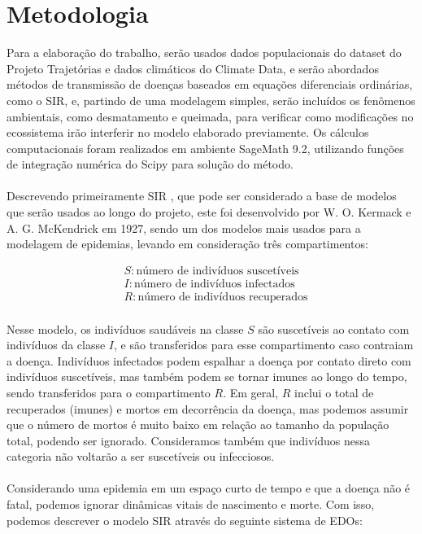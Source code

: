 \chapter{Metodologia}

Para a elaboração do trabalho, serão usados dados populacionais 
do dataset do Projeto Trajetórias e dados climáticos do Climate Data, 
e serão abordados métodos de transmissão de doenças baseados em equações 
diferenciais ordinárias, como o SIR, e, partindo de uma modelagem simples, 
serão incluídos os fenômenos ambientais, como desmatamento e queimada, para 
verificar como modificações no ecossistema irão interferir no modelo elaborado 
previamente. Os cálculos computacionais foram realizados em ambiente SageMath 9.2, 
utilizando funções de integração numérica do Scipy para solução do método.
\\\\
Descrevendo primeiramente SIR \cite{githubMODBIO, Prasad2022}, que pode ser considerado a base de modelos que serão usados ao longo do projeto, este foi desenvolvido por W. O. Kermack e A. G. McKendrick em 1927, sendo um dos modelos mais usados para a modelagem de epidemias, levando em consideração três compartimentos:

\begin{align*}
    & S: \text{número de indivíduos suscetíveis} \\
    & I: \text{número de indivíduos infectados} \\
    & R: \text{número de indivíduos recuperados}
\end{align*}
\\
Nesse modelo, os indivíduos saudáveis na classe $S$ são suscetíveis ao contato com indivíduos da classe $I$, e são transferidos para esse compartimento caso contraiam a doença. Indivíduos infectados podem espalhar a doença por contato direto com indivíduos suscetíveis, mas também podem se tornar imunes ao longo do tempo, sendo transferidos para o compartimento $R$. Em geral, $R$ inclui o total de recuperados (imunes) e mortos em decorrência da doença, mas podemos assumir que o número de mortos é muito baixo em relação ao tamanho da população total, podendo ser ignorado. Consideramos também que indivíduos nessa categoria não voltarão a ser suscetíveis ou infecciosos.   
\\\\
Considerando uma epidemia em um espaço curto de tempo e que a doença não é fatal, podemos ignorar dinâmicas vitais de nascimento e morte. Com isso, podemos descrever o modelo SIR através do seguinte sistema de EDOs:


